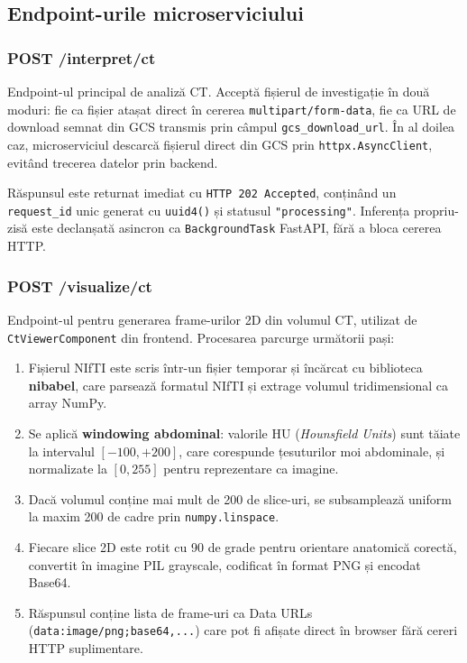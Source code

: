 \documentclass[12pt, a4paper]{report}
\begin{document}
\subsection{Endpoint-urile microserviciului}

\subsubsection{POST /interpret/ct}

Endpoint-ul principal de analiză CT. Acceptă fișierul de investigație în două
moduri: fie ca fișier atașat direct în cererea \texttt{multipart/form-data}, fie
ca URL de download semnat din GCS transmis prin câmpul \texttt{gcs\_download\_url}.
În al doilea caz, microserviciul descarcă fișierul direct din GCS prin
\texttt{httpx.AsyncClient}, evitând trecerea datelor prin backend.

Răspunsul este returnat imediat cu \texttt{HTTP 202 Accepted}, conținând un
\texttt{request\_id} unic generat cu \texttt{uuid4()} și statusul
\texttt{"processing"}. Inferența propriu-zisă este declanșată asincron ca
\texttt{BackgroundTask} FastAPI, fără a bloca cererea HTTP.

\subsubsection{POST /visualize/ct}

Endpoint-ul pentru generarea frame-urilor 2D din volumul CT, utilizat de
\texttt{CtViewerComponent} din frontend. Procesarea parcurge următorii pași:

\begin{enumerate}
    \item Fișierul NIfTI este scris într-un fișier temporar și încărcat cu
          biblioteca \textbf{nibabel}, care parsează formatul NIfTI și extrage
          volumul tridimensional ca array NumPy.
    \item Se aplică \textbf{windowing abdominal}: valorile HU (\textit{Hounsfield
          Units}) sunt tăiate la intervalul $[-100, +200]$, care corespunde
          țesuturilor moi abdominale, și normalizate la $[0, 255]$ pentru
          reprezentare ca imagine.
    \item Dacă volumul conține mai mult de 200 de slice-uri, se subsamplează
          uniform la maxim 200 de cadre prin \texttt{numpy.linspace}.
    \item Fiecare slice 2D este rotit cu 90 de grade pentru orientare anatomică
          corectă, convertit în imagine PIL grayscale, codificat în format PNG
          și encodat Base64.
    \item Răspunsul conține lista de frame-uri ca Data URLs
          (\texttt{data:image/png;base64,...}) care pot fi afișate direct în
          browser fără cereri HTTP suplimentare.
\end{enumerate}
\end{document}
